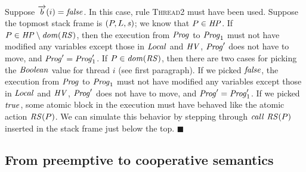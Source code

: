 Suppose $\overrightarrow{b}(i) = \mathit{false}$.
In this case, rule \textsc{Thread2} must have been used.
Suppose the topmost stack frame is $(P,L,\mathit{s})$; we know that $P \in \mathit{HP}$.
If $P \in \mathit{HP} \setminus \mathit{dom}(\mathit{RS})$, then the execution from $\mathit{Prog}$ to $\mathit{Prog}_1$ must not have modified any variables except those in $\mathit{Local}$
and $\mathit{HV}$, $\mathit{Prog}'$ does not have to move, and $\mathit{Prog}' = \mathit{Prog}'_1$.
If $P \in \mathit{dom}(\mathit{RS})$, then there are two cases for picking the $\mathit{Boolean}$ value for thread $i$ (see first paragraph). 
If we picked $\mathit{false}$, the execution from $\mathit{Prog}$ to $\mathit{Prog}_1$ must not have modified any variables except those in $\mathit{Local}$
and $\mathit{HV}$, $\mathit{Prog}'$ does not have to move, and $\mathit{Prog}' = \mathit{Prog}'_1$.
If we picked $\mathit{true}$, some atomic block in the execution must have behaved like the atomic action $\mathit{RS}(P)$.
We can simulate this behavior by stepping through $\mathit{call}\ \mathit{RS}(P)$ inserted in the stack frame just below the top.
$\blacksquare$

\subsection{From preemptive to cooperative semantics}
\label{sec:yield-sufficiency}

